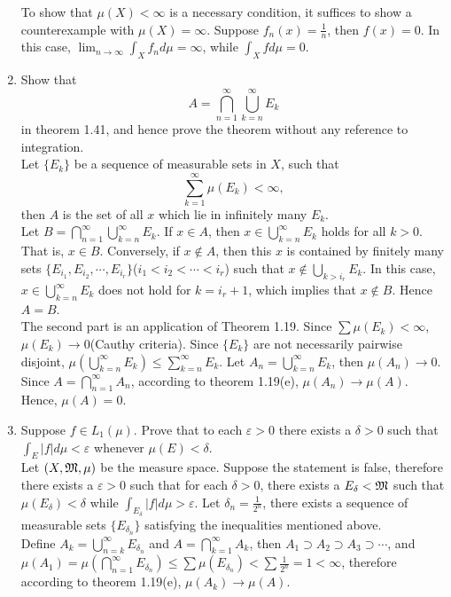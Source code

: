 \documentclass{article}
\begin{document}
\begin{enumerate}
 	To show that $\mu(X)<\infty$ is a necessary condition, it suffices to show a counterexample with $\mu(X)=\infty$. Suppose $f_n(x)=\frac{1}{n}$, then $f(x)=0$. In this case, $\lim_{n\to\infty}\int_{X}f_nd\mu=\infty$, while $\int_{X}fd\mu=0$.
 	\item \exercise Show that 
 	\[
 		A=\bigcap_{n=1}^{\infty}\bigcup_{k=n}^{\infty}E_k
 	\]
 	in theorem 1.41, and hence prove the theorem without any reference to integration.\\
 	\solution Let $\{E_k\}$ be a sequence of measurable sets in $X$, such that
 	\[
 		\sum_{k=1}^{\infty}\mu(E_k)<\infty,
 	\]
 	then $A$ is the set of all $x$ which lie in infinitely many $E_k$.\\
 	Let $B=\bigcap_{n=1}^{\infty}\bigcup_{k=n}^{\infty}E_k$. If $x\in{A}$, then $x\in\bigcup_{k=n}^{\infty}E_k$ holds for all $k>0$. That is, $x\in{B}$. Conversely, if $x\notin{A}$, then this $x$ is contained by finitely many sets $\{E_{i_1},E_{i_2},\cdots,E_{i_r}\}$($i_1<i_2<\cdots<i_r$) such that $x\notin\bigcup_{k>i_r}E_{k}$. In this case, $x\in\bigcup_{k=n}^{\infty}E_k$ does not hold for $k=i_r+1$, which implies that $x\notin{B}$. Hence $A=B$.\\
 	The second part is an application of Theorem 1.19.  Since $\sum\mu(E_k)<\infty$, $\mu(E_k)\to 0$(Cauthy criteria). Since $\{E_k\}$ are not necessarily pairwise disjoint, $\mu(\bigcup_{k=n}^{\infty}E_k)\leq\sum_{k=n}^{\infty}E_k$. Let $A_n=\bigcup_{k=n}^{\infty}E_k$, then $\mu(A_n)\to{0}$. Since $A=\bigcap_{n=1}^{\infty}A_n$, according to theorem 1.19(e), $\mu(A_n)\to\mu(A)$. Hence, $\mu(A)=0$.
 	\item \exercise Suppose $f\in L_1(\mu)$. Prove that to each $\varepsilon>0$ there exists a $\delta>0$ such that $\int_E|f|d\mu<\varepsilon$ whenever $\mu(E)<\delta$.\\
 	\solution Let $(X,\mathfrak{M},\mu)$ be the measure space. Suppose the statement is false, therefore there exists a $\varepsilon>0$ such that for each $\delta>0$, there exists a $E_\delta<\mathfrak{M}$ such that $\mu(E_\delta)<\delta$ while $\int_{E_\delta}|f|d\mu>\varepsilon$. Let $\delta_n=\frac{1}{2^n}$, there exists a sequence of measurable sets $\{E_{\delta_n}\}$ satisfying the inequalities mentioned above.\\
 	Define $A_k=\bigcup_{n=k}^{\infty}E_{\delta_n}$ and $A=\bigcap_{k=1}^{\infty}A_k$, then $A_1\supset A_2\supset A_3\supset\cdots$, and $\mu(A_1)=\mu(\bigcap_{n=1}^{\infty}E_{\delta_n})\leq\sum\mu(E_{\delta_n})<\sum\frac{1}{2^n}=1<\infty$, therefore according to theorem 1.19(e), $\mu(A_k)\to\mu(A)$.\\

\end{enumerate}
\end{document}
